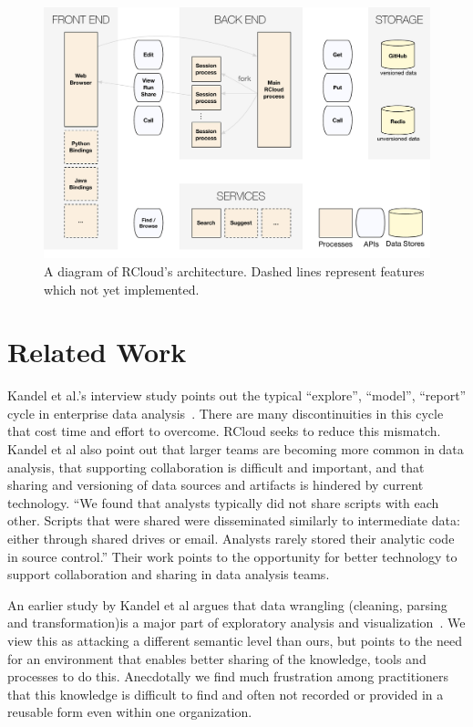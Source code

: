 \begin{figure}
\includegraphics[width=\linewidth]{fig/system/system.pdf}
\caption{\label{fig:system}A diagram of RCloud's architecture. Dashed
  lines represent features which not yet implemented. }
\end{figure}

\section{Related Work}

Kandel et al.'s interview study points out the typical ``explore'',
``model'', ``report'' cycle in enterprise data
analysis~\cite{Kandel:2012:EDA}. There are many discontinuities in
this cycle that cost time and effort to overcome. RCloud seeks to
reduce this mismatch. Kandel et al also point out that larger teams
are becoming more common in data analysis, that supporting
collaboration is difficult and important, and that sharing
and versioning of data sources and artifacts is hindered by current
technology. ``We found that analysts typically did not
share scripts with each other. Scripts that were shared were
disseminated similarly to intermediate data: either through shared
drives or email. Analysts rarely stored their analytic code in source
control.'' Their work points to the opportunity for better technology
to support collaboration and sharing in data analysis teams.

An earlier study by Kandel et al argues that data wrangling
(cleaning, parsing and transformation)is a major part of exploratory
analysis and visualization~\cite{Kandel:2011:RDI}. We view this
as attacking a different semantic level than ours, but points
to the need for an environment that enables better sharing
of the knowledge, tools and processes to do this. Anecdotally
we find much frustration among practitioners that this knowledge
is difficult to find and often not recorded or provided in a reusable
form even within one organization.

